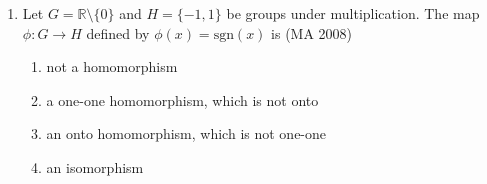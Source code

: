 \begin{enumerate}[label=\thesubsection.\arabic*,ref=\thesubsection.\theenumi]
\item Let \(G = \mathbb{R} \setminus \{0\}\) and \(H = \{-1,1\}\) be groups under multiplication. The map \(\phi : G \to H\) defined by \(\phi(x) = \mathrm{sgn}(x)\) is
\hfill (MA 2008)

\begin{enumerate}
\item not a homomorphism
\item a one-one homomorphism, which is not onto
\item an onto homomorphism, which is not one-one
\item an isomorphism
\end{enumerate}
\end{enumerate}

